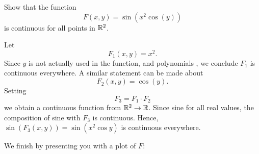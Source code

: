 \documentclass{ximera}
\begin{document}
\begin{example}
  Show that the function
  \[
  F(x,y) = \sin(x^2\cos(y))
  \]
  is continuous for all points in $\mathbb R^2$.
  \begin{explanation}
    Let
    \[
    F_1(x,y) = x^2.
    \]
    Since $y$ is not actually used in the function, and polynomials
    , we conclude $F_1$ is continuous everywhere. A
    similar statement can be made about
    \[
    F_2(x,y) = \cos(y).
    \]
    Setting
    \[
    F_3=F_1\cdot F_2
    \]
    we obtain a continuous function from $\mathbb R^2\to \mathbb R$. Since sine  for all real values, the composition of sine with $F_3$
    is continuous. Hence, $\sin (F_3(x,y)) = \sin(x^2\cos y)$ is
    continuous everywhere.
    \begin{onlineOnly}
      We finish by presenting you with a plot of $F$:
      \begin{center}
      \end{center}
    \end{onlineOnly}
  \end{explanation}
\end{example}
\end{document}
